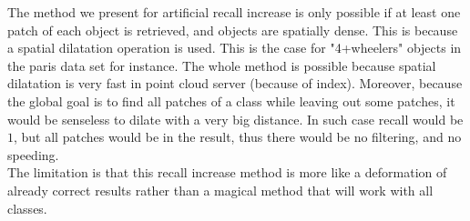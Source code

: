			The method we present for artificial recall increase is only possible if at least one patch of each object is retrieved, and objects are spatially dense.
			This is because a spatial dilatation operation is used.
			This is the case for "4+wheelers" objects in the paris data set for instance.
			The whole method is possible because spatial dilatation is very fast in point cloud server (because of index).
			Moreover, because the global goal is to find all patches of a class while leaving out some patches,
			it would be senseless to dilate with a very big distance.
			In such case recall would be $1$, but all patches would be in the result, thus there would be no filtering, and no speeding.
			\\
			The limitation is that this recall increase method is more like a deformation of already correct results 
			rather than a magical method that will work with all classes.
				